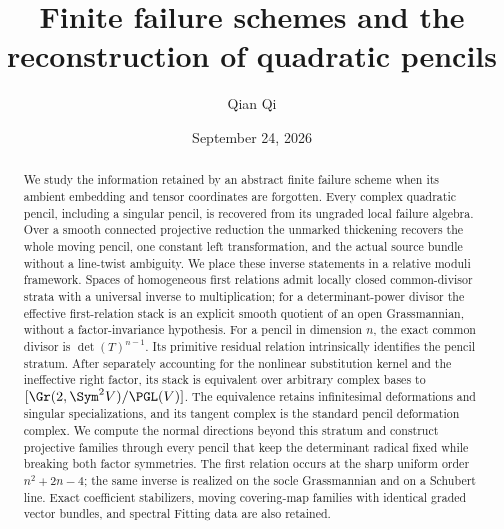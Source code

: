 \title[Finite failure schemes and quadratic pencils]{Finite failure schemes and the reconstruction of quadratic pencils}
\author{Qian Qi}
\date{September 24, 2026}
\begin{abstract}
We study the information retained by an abstract finite failure scheme
when its ambient embedding and tensor coordinates are forgotten.
Every complex quadratic pencil, including a singular pencil, is
recovered from its ungraded local failure algebra.  Over a smooth
connected projective reduction the unmarked thickening recovers the
whole moving pencil, one constant left transformation, and the actual
source bundle without a line-twist ambiguity.  We place these inverse
statements in a relative moduli framework.  Spaces of homogeneous first
relations admit locally closed common-divisor strata with a universal
inverse to multiplication; for a determinant-power divisor the
effective first-relation stack is an explicit smooth quotient of an
open Grassmannian, without a factor-invariance hypothesis.  For a
pencil in dimension \(n\), the exact common divisor is
\(\det(T)^{n-1}\).  Its primitive residual relation intrinsically
identifies the pencil stratum.  After separately accounting for the
nonlinear substitution kernel and the ineffective right factor, its
stack is equivalent over arbitrary complex bases to
\([\Gr(2,\Sym^2 V)/\PGL(V)]\).  The equivalence retains infinitesimal
deformations and singular specializations, and its tangent complex
is the standard pencil deformation complex.  We compute the normal
directions beyond this stratum and construct projective families
through every pencil that keep the determinant radical fixed while
breaking both factor symmetries.  The first relation occurs at the
sharp uniform order \(n^2+2n-4\); the same inverse is realized on the
socle Grassmannian and on a Schubert line.  Exact coefficient
stabilizers, moving covering-map families with identical graded
vector bundles, and spectral Fitting data are also retained.
\end{abstract}
\maketitle

